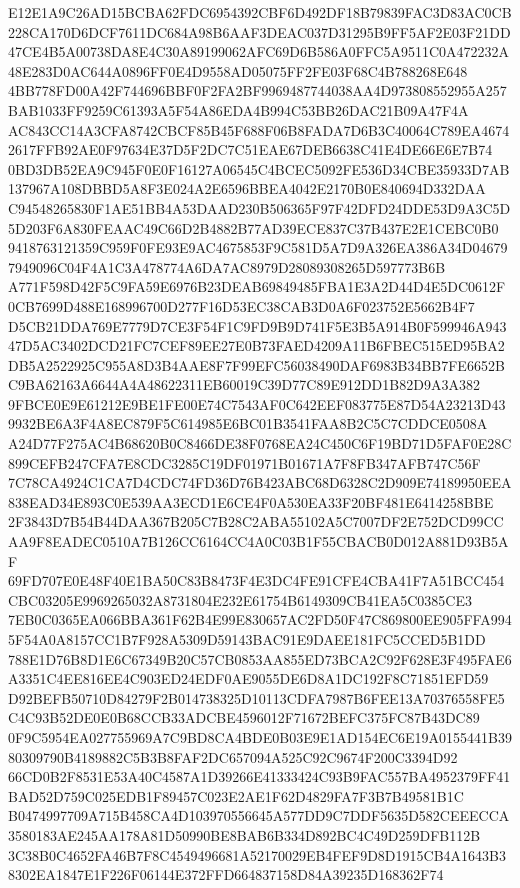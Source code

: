 \documentclass[UTF8,fontset=fandol,zihao=-4,a4paper]{ctexart}
\begin{document}
{{E12E1A9C26AD15BCBA62FDC6954392CBF6D492DF18B79839FAC3D83AC0CB228CA170D6DCF7611DC684A98B6AAF3DEAC037D31295B9FF5AF2E03F21DD
47CE4B5A00738DA8E4C30A89199062AFC69D6B586A0FFC5A9511C0A472232A48E283D0AC644A0896FF0E4D9558AD05075FF2FE03F68C4B788268E648
4BB778FD00A42F744696BBF0F2FA2BF9969487744038AA4D973808552955A257BAB1033FF9259C61393A5F54A86EDA4B994C53BB26DAC21B09A47F4A
AC843CC14A3CFA8742CBCF85B45F688F06B8FADA7D6B3C40064C789EA46742617FFB92AE0F97634E37D5F2DC7C51EAE67DEB6638C41E4DE66E6E7B74
0BD3DB52EA9C945F0E0F16127A06545C4BCEC5092FE536D34CBE35933D7AB137967A108DBBD5A8F3E024A2E6596BBEA4042E2170B0E840694D332DAA
C94548265830F1AE51BB4A53DAAD230B506365F97F42DFD24DDE53D9A3C5D5D203F6A830FEAAC49C66D2B4882B77AD39ECE837C37B437E2E1CEBC0B0
9418763121359C959F0FE93E9AC4675853F9C581D5A7D9A326EA386A34D046797949096C04F4A1C3A478774A6DA7AC8979D28089308265D597773B6B
A771F598D42F5C9FA59E6976B23DEAB69849485FBA1E3A2D44D4E5DC0612F0CB7699D488E168996700D277F16D53EC38CAB3D0A6F023752E5662B4F7
D5CB21DDA769E7779D7CE3F54F1C9FD9B9D741F5E3B5A914B0F599946A94347D5AC3402DCD21FC7CEF89EE27E0B73FAED4209A11B6FBEC515ED95BA2
DB5A2522925C955A8D3B4AAE8F7F99EFC56038490DAF6983B34BB7FE6652BC9BA62163A6644A4A48622311EB60019C39D77C89E912DD1B82D9A3A382
9FBCE0E9E61212E9BE1FE00E74C7543AF0C642EEF083775E87D54A23213D439932BE6A3F4A8EC879F5C614985E6BC01B3541FAA8B2C5C7CDDCE0508A
A24D77F275AC4B68620B0C8466DE38F0768EA24C450C6F19BD71D5FAF0E28C899CEFB247CFA7E8CDC3285C19DF01971B01671A7F8FB347AFB747C56F
7C78CA4924C1CA7D4CDC74FD36D76B423ABC68D6328C2D909E74189950EEA838EAD34E893C0E539AA3ECD1E6CE4F0A530EA33F20BF481E6414258BBE
2F3843D7B54B44DAA367B205C7B28C2ABA55102A5C7007DF2E752DCD99CCAA9F8EADEC0510A7B126CC6164CC4A0C03B1F55CBACB0D012A881D93B5AF
69FD707E0E48F40E1BA50C83B8473F4E3DC4FE91CFE4CBA41F7A51BCC454CBC03205E9969265032A8731804E232E61754B6149309CB41EA5C0385CE3
7EB0C0365EA066BBA361F62B4E99E830657AC2FD50F47C869800EE905FFA9945F54A0A8157CC1B7F928A5309D59143BAC91E9DAEE181FC5CCED5B1DD
788E1D76B8D1E6C67349B20C57CB0853AA855ED73BCA2C92F628E3F495FAE6A3351C4EE816EE4C903ED24EDF0AE9055DE6D8A1DC192F8C71851EFD59
D92BEFB50710D84279F2B014738325D10113CDFA7987B6FEE13A70376558FE5C4C93B52DE0E0B68CCB33ADCBE4596012F71672BEFC375FC87B43DC89
0F9C5954EA027755969A7C9BD8CA4BDE0B03E9E1AD154EC6E19A0155441B3980309790B4189882C5B3B8FAF2DC657094A525C92C9674F200C3394D92
66CD0B2F8531E53A40C4587A1D39266E41333424C93B9FAC557BA4952379FF41BAD52D759C025EDB1F89457C023E2AE1F62D4829FA7F3B7B49581B1C
B0474997709A715B458CA4D103970556645A577DD9C7DDF5635D582CEEECCA3580183AE245AA178A81D50990BE8BAB6B334D892BC4C49D259DFB112B
3C38B0C4652FA46B7F8C4549496681A52170029EB4FEF9D8D1915CB4A1643B38302EA1847E1F226F06144E372FFD664837158D84A39235D168362F74
}}
\end{document}

